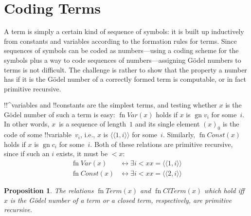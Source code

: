 \documentclass[10pt,a4paper]{article}
\theoremstyle{plain}
\newtheorem{prop}[thm]{Proposition}
\theoremstyle{definition}
\theoremstyle{remark}
\newenvironment{explain}{}{}
\newcommand*{\olfileid}[3]{}
\newcommand*{\olsection}[1]{\section*{#1}}
\newcommand*{\ollabel}[1]{\label{#1}}
\providecommand{\Obj}{}
\providecommand{\tuple}[1]{\langle #1 \rangle}
\providecommand{\Gn}{\operatorname{gn}}
\providecommand{\bexists}{\exists}
\providecommand{\defiff}{\mathrel{\leftrightarrow}}
\providecommand{\fn}{\operatorname{fn}}
\providecommand{\defiff}{\mathrel{\leftrightarrow}}
\providecommand{\fn}{\operatorname{fn}}
\begin{document}



\olfileid{inc}{art}{trm}
\olsection{Coding Terms}

\begin{explain}
A term is simply a certain kind of sequence of symbols: it is built up
inductively from constants and variables according to the formation
rules for terms.  Since sequences of symbols can be coded as
numbers---using a coding scheme for the symbols plus a way to code
sequences of numbers---assigning G\"odel numbers to terms is not
difficult.  The challenge is rather to show that the property a number
has if it is the G\"odel number of a correctly formed term is
computable, or in fact primitive recursive.
\end{explain}

!!^{variable}s and !!{constant}s are the simplest terms, and testing
whether $x$ is the G\"odel number of such a term is easy:
$\fn{Var}(x)$ holds if $x$ is $\Gn{\Obj v_i}$ for some~$i$. In other words,
$x$~is a sequence of length~$1$ and its single element $(x)_0$ is the
code of some !!{variable}~$\Obj v_i$, i.e., $x$ is $\tuple{\tuple{1, i}}$ for
some~$i$. Similarly, $\fn{Const}(x)$ holds if $x$ is $\Gn{\Obj c_i}$ for
some~$i$. Both of these relations are primitive recursive, since if
such an $i$ exists, it must be $< x$:
\begin{align*}
  \fn{Var}(x) & \defiff \bexists{i<x}{x = \tuple{\tuple{1, i}}}\\
  \fn{Const}(x) & \defiff \bexists{i<x}{x = \tuple{\tuple{2, i}}}
\end{align*}

\begin{prop}
\ollabel{prop:term-primrec}
The relations $\fn{Term}(x)$ and $\fn{ClTerm}(x)$ which hold iff $x$
is the G\"odel number of a term or a closed term, respectively, are
primitive recursive.
\end{prop}
\end{document}
